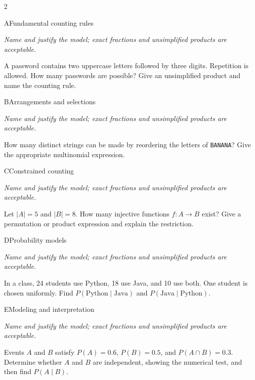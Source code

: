 \documentclass[9pt]{extarticle}
\begin{document}
\CoreWorkArea
\FormBreak
{}
\begin{multicols}{2}
\begin{CoreProblem}{A}{Fundamental counting rules}
{\scriptsize\textit{Name and justify the model; exact fractions and unsimplified products are acceptable.}\par}
A password contains two uppercase letters followed by three digits.
    Repetition is allowed. How many passwords are possible? Give an unsimplified
    product and name the counting rule.
\end{CoreProblem}
\begin{CoreProblem}{B}{Arrangements and selections}
{\scriptsize\textit{Name and justify the model; exact fractions and unsimplified products are acceptable.}\par}
How many distinct strings can be made by reordering the letters of
    \texttt{BANANA}? Give the appropriate multinomial expression.
\end{CoreProblem}
\begin{CoreProblem}{C}{Constrained counting}
{\scriptsize\textit{Name and justify the model; exact fractions and unsimplified products are acceptable.}\par}
Let $|A|=5$ and $|B|=8$. How many injective functions $f:A\to B$
    exist? Give a permutation or product expression and explain the restriction.
\end{CoreProblem}
\columnbreak
\begin{CoreProblem}{D}{Probability models}
{\scriptsize\textit{Name and justify the model; exact fractions and unsimplified products are acceptable.}\par}
In a class, 24 students use Python, 18 use Java, and 10 use both.
    One student is chosen uniformly. Find
    $P(\text{Python}\mid\text{Java})$ and
    $P(\text{Java}\mid\text{Python})$.
\end{CoreProblem}
\begin{CoreProblem}{E}{Modeling and interpretation}
{\scriptsize\textit{Name and justify the model; exact fractions and unsimplified products are acceptable.}\par}
Events $A$ and $B$ satisfy $P(A)=0.6$, $P(B)=0.5$, and
    $P(A\cap B)=0.3$. Determine whether $A$ and $B$ are independent, showing
    the numerical test, and then find $P(A\mid B)$.
\end{CoreProblem}
\end{multicols}
\CoreWorkArea
\FormBreak
{}
\end{document}

